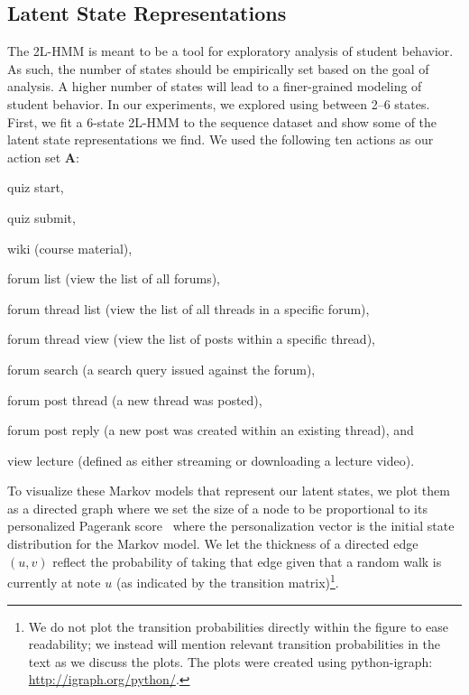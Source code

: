 \subsection{Latent State Representations}
The 2L-HMM is meant to be a tool for exploratory analysis of student
behavior. As such, the number of states should be empirically set based on
the goal of analysis. A higher number of states will lead to a
finer-grained modeling of student behavior. In our experiments, we explored
using between 2--6 states. First, we fit a 6-state 2L-HMM to the
\textretrieval{} sequence dataset and show some of the latent state
representations we find. We used the following ten actions as our action
set $\mathbf{A}$:
\begin{enumerate*}[label=(\arabic*)]
  \item quiz start,
  \item quiz submit,
  \item wiki (course material),
  \item forum list (view the list of all forums),
  \item forum thread list (view the list of all threads in a specific
    forum),
  \item forum thread view (view the list of posts within a specific
    thread),
  \item forum search (a search query issued against the forum),
  \item forum post thread (a new thread was posted),
  \item forum post reply (a new post was created within an existing
    thread), and
  \item view lecture (defined as either streaming or downloading a lecture
    video).
\end{enumerate*}

To visualize these Markov models that represent our latent states, we plot
them as a directed graph where we set the size of a node to be proportional
to its personalized Pagerank score~\cite{Page:1999:PageRank, Jeh:2003:WWW}
where the personalization vector is the initial state distribution for the
Markov model. We let the thickness of a directed edge $(u, v)$ reflect the
probability of taking that edge given that a random walk is currently at
note $u$ (as indicated by the transition matrix)\footnote{We do not plot
the transition probabilities directly within the figure to ease
readability; we instead will mention relevant transition probabilities in
the text as we discuss the plots. The plots were created using
python-igraph: \url{http://igraph.org/python/}.}.

